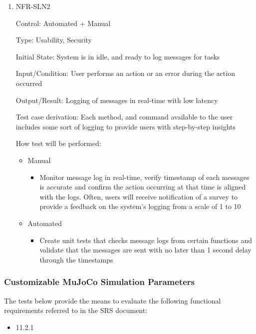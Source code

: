 \documentclass[12pt, titlepage]{article}
\begin{document}
\begin{enumerate}

\item NFR-SLN2

Control: Automated + Manual

Type: Usability, Security

Initial State: System is in idle, and ready to log messages for tasks

Input/Condition: User performs an action or an error during the action occurred

Output/Result: Logging of messages in real-time with low latency

Test case derivation: Each method, and command available to the user includes some sort of logging to provide users with step-by-step insights

How test will be performed:
\begin{itemize}
  \item Manual
  \begin{itemize}
    \item Monitor message log in real-time, verify timestamp of each messages is accurate and confirm the action occurring at that time is aligned with the logs. Often, users will receive notification of a survey to provide a feedback on the system's logging from a scale of 1 to 10
  \end{itemize}
  \item Automated
  \begin{itemize}
    \item Create unit tests that checks message logs from certain functions and validate that the messages are sent with no later than 1 second delay through the timestamps
  \end{itemize}
\end{itemize}

\end{enumerate}

\subsubsection{Customizable MuJoCo Simulation Parameters}

The tests below provide the means to evaluate the following functional requirements referred to in the SRS document:
\begin{itemize}
  \item 11.2.1
\end{itemize}
\end{document}
